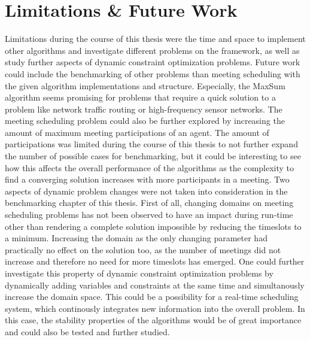 \chapter{Limitations \& Future Work}
\label{c:limitations}
Limitations during the course of this thesis were the time and space to implement other algorithms and investigate different problems on the framework, as well as study further aspects of dynamic constraint optimization problems. 
Future work could include the benchmarking of other problems than meeting scheduling with the given algorithm implementations and structure. Especially, the MaxSum algorithm seems promising for problems that require a quick solution to a problem like network traffic routing or high-frequency sensor networks. The meeting scheduling problem could also be further explored by increasing the amount of maximum meeting participations of an agent. The amount of participations was limited during the course of this thesis to not further expand the number of possible cases for benchmarking, but it could be interesting to see how this affects the overall performance of the algorithms as the complexity to find a converging solution increases with more participants in a meeting.
 \newline \newline
 Two aspects of dynamic problem changes were not taken into consideration in the benchmarking chapter of this thesis. First of all, changing domains on meeting scheduling problems has not been observed to have an impact during run-time other than rendering a complete solution impossible by reducing the timeslots to a minimum. Increasing the domain as the only changing parameter had practically no effect on the solution too, as the number of meetings did not increase and therefore no need for more timeslots has emerged. One could further investigate this property of dynamic constraint optimization problems by dynamically adding variables and constraints at the same time and simultanously increase the domain space. This could be a possibility for a real-time scheduling system, which continously integrates new information into the overall problem. In this case, the stability properties of the algorithms would be of great importance and could also be tested and further studied.
 

 